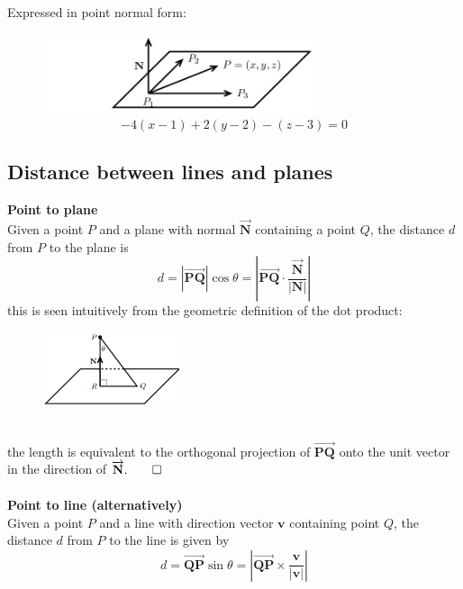 \documentclass{report}
\begin{document}
Expressed in point normal form:
\begin{figure}[h]
\includegraphics[width=8cm]{Capture82}\\
\centering
\begin{equation*}
-4(x-1)+2(y-2)-(z-3)=0
\end{equation*}
\end{figure}
\newpage

\subsection{Distance between lines and planes} %
\textbf{Point to plane}\\
Given a point $P$ and a plane with normal $\overrightarrow{\mathbf{N}}$ containing a point $Q$,
the distance $d$ from $P$ to the plane is 
\begin{equation*}
d=|\overrightarrow{\mathbf{PQ}}|\cos\theta
=\left|\overrightarrow{\mathbf{PQ}}\cdot
\frac{\overrightarrow{\mathbf{N}}}{|\mathbf{N}|}\right|
\end{equation*}
this is seen intuitively from the geometric definition of the dot product:
\begin{figure}[h]
\includegraphics[width=4cm]{Capture83}\\
\centering
\end{figure}\\
the length is equivalent to the orthogonal projection of $\overrightarrow{\mathbf{PQ}}$ onto
the unit vector in the direction of $\overrightarrow{\mathbf{N}}.\qed$\\
\vspace{1mm}\\
\textbf{Point to line (alternatively)}\\
Given a point $P$ and a line with direction vector $\mathbf{v}$ containing point $Q$, the 
distance $d$ from $P$ to the line is given by
\begin{equation*}
d=\overrightarrow{\mathbf{QP}}\sin\theta
=\left|\overrightarrow{\mathbf{QP}}\times\frac{\mathbf{v}}{|\mathbf{v}|}\right|
\end{equation*}
\end{document}
